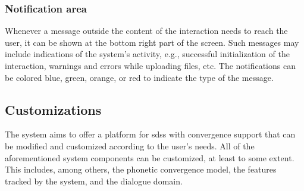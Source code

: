\subsubsection{Notification area}
\label{subsubsec:notification_area}

Whenever a message outside the content of the interaction needs to reach the user, it can be shown at the bottom right part of the screen.
Such messages may include indications of the system's activity, e.g., successful initialization of the interaction, warnings and errors while uploading files, etc.
The notifications can be colored blue, green, orange, or red to indicate the type of the message.

%

\subsection{Customizations}
\label{subsec:models_and_cusomizations}

The system aims to offer a platform for \acp{sds} with convergence support that can be modified and customized according to the user's needs.
All of the aforementioned system components can be customized, at least to some extent.
This includes, among others, the phonetic convergence model, the features tracked by the system, and the dialogue domain.

